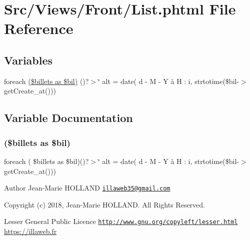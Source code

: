\hypertarget{_front_2_list_8phtml}{}\section{Src/\+Views/\+Front/\+List.phtml File Reference}
\label{_front_2_list_8phtml}
\subsection*{Variables}
\begin{DoxyCompactItemize}
\item 
foreach \hyperlink{_front_2_list_8phtml_a1f60df41da29a5ab6912652ef3c1cea5}{(\$billets as \$bil)} ()?$>$\char`\"{} alt = date(\textquotesingle{} d -\/ M -\/ Y à H \+: i\textquotesingle{}, strtotime(\$bil-\/$>$get\+Create\+\_\+at()))
\end{DoxyCompactItemize}


\subsection{Variable Documentation}
\mbox{\label{_front_2_list_8phtml_a1f60df41da29a5ab6912652ef3c1cea5}} 
\subsubsection{\texorpdfstring{(\$billets as \$bil)}{($billets as $bil)}}
{\footnotesize\ttfamily foreach ( \$billets as \$bil)()?$>$\char`\"{} alt = date(\textquotesingle{} d -\/ M -\/ Y à H \+: i\textquotesingle{}, strtotime(\$bil-\/$>$get\+Create\+\_\+at()))}

\begin{DoxyAuthor}{Author}
Jean-\/\+Marie H\+O\+L\+L\+A\+ND \href{mailto:illaweb35@gmail.com}{\tt illaweb35@gmail.\+com} 
\end{DoxyAuthor}
\begin{DoxyCopyright}{Copyright}
(c) 2018, Jean-\/\+Marie H\+O\+L\+L\+A\+ND. All Rights Reserved.
\end{DoxyCopyright}
Lesser General Public Licence \href{http://www.gnu.org/copyleft/lesser.html}{\tt http\+://www.\+gnu.\+org/copyleft/lesser.\+html} \hyperlink{}{https\+://illaweb.\+fr}